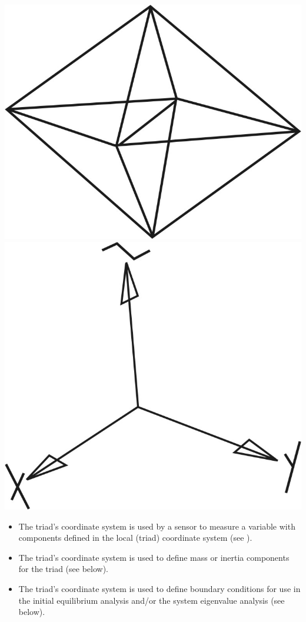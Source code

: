 \begin{minipage}{0.4\textwidth}
  \raggedleft
  \includegraphics[scale=0.4]{Figures/DiamondRedo} \\[10mm]
  \includegraphics[scale=0.4]{Figures/CoordinateSystem}
\end{minipage}

\medskip
\begin{itemize}
\item
  The triad's coordinate system is used by a sensor to  measure a variable with
  components defined in the local (triad) coordinate system
  (see ).
\item
  The triad's coordinate system is used to define mass or inertia components
  for the triad (see  below).
\item
  The triad's coordinate system is used to define boundary conditions for use
  in the initial equilibrium analysis and/or the system eigenvalue analysis
  (see  below).
\end{itemize}

